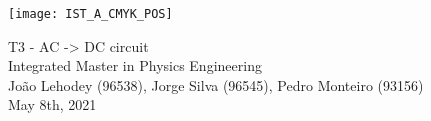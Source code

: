 
\thispagestyle {empty}

\texttt{[image: IST\_A\_CMYK\_POS]}

\begin{center}
%
\vspace{1.0cm}

\vspace{1cm}
{\FontLb T3 - AC -> DC circuit} \\ %
\vspace{1cm}
{\FontSn Integrated Master in Physics Engineering} \\ %
\vspace{1cm}
{\FontSn João Lehodey (96538), Jorge Silva (96545), Pedro Monteiro (93156)} \\
\vspace{1cm}
{\FontSn May 8th, 2021} \\ %
%
\end{center}

